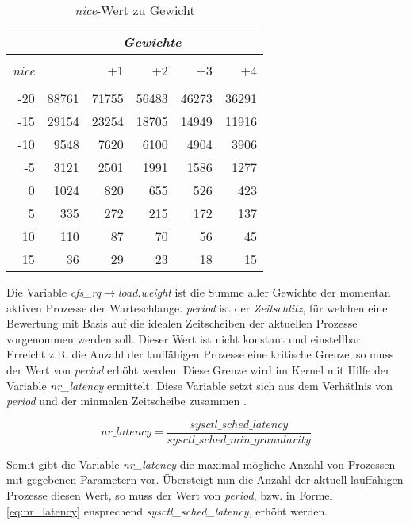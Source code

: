 \begin {table}[h]
\begin{center}
\begin{tabular}{r|rrrrr}
 &	\multicolumn{5}{c}{\textit{Gewichte}} \\
	\hline\hline
	\\[\dimexpr-\normalbaselineskip+2pt]
	\textit{nice} & &+1	&	+2	& +3	& +4	\\
	\hline
    \\[\dimexpr-\normalbaselineskip+2pt]
	-20	&	88761	&	71755	&	56483	&	46273	&	36291	\\
	-15	&	29154 	&	23254 	&	18705 	&	14949 	&	11916	\\
	-10	&	9548	&	7620	&	6100	&	4904	&	3906	\\
	-5 	&	3121 	&	2501 	&	1991 	&	1586 	&	1277	\\
	0	&	1024 	&	820		&	655		&	526		&	423		\\
	5 	&	335 	&	272		& 	215		&	172		&	137		\\
	10	&	110		&	87 		&	70 		&	56 		&	45		\\
	15 	&	36 		&	29 		&	23 		&	18 		&	15	 	\\		
\end{tabular}
\caption {\textit{nice}-Wert zu Gewicht} \label{tab:nice2weight} 
\end{center}
\end{table}

   
Die Variable \textit{cfs\_rq$\rightarrow$load.weight} ist die Summe aller Gewichte der momentan aktiven Prozesse der Warte\-schlan\-ge.
\textit{period} ist der \textit{Zeitschlitz}, für welchen eine Bewertung mit Basis auf die idealen Zeitscheiben der aktuellen Prozesse vorgenommen werden soll. Dieser Wert ist nicht konstant und einstellbar. Erreicht z.B. die Anzahl der lauf\-fähigen Prozesse eine kritische Grenze, so muss der Wert von \textit{period} erhöht werden. 
Diese Grenze wird im Kernel mit Hilfe der Variable \textit{nr\_latency} ermittelt. Diese Variable setzt sich aus dem Verhätlnis von \textit{period} und der minmalen Zeitscheibe zusammen \cite{paperfairness}.

\begin{equation}
nr\_latency = \frac{sysctl\_sched\_latency}{sysctl\_sched\_min\_granularity}
\label{eq:nr_latency}
\end{equation}

Somit gibt die Variable \textit{nr\_latency} die maximal mögliche Anzahl von Prozessen mit gegebenen Parametern vor. Über\-steigt nun die Anzahl der aktuell lauffähigen Prozesse diesen Wert, so muss der Wert von \textit{period}, bzw. in Formel \ref{eq:nr_latency} ensprechend \textit{sysctl\_sched\_latency}, erhöht werden.


